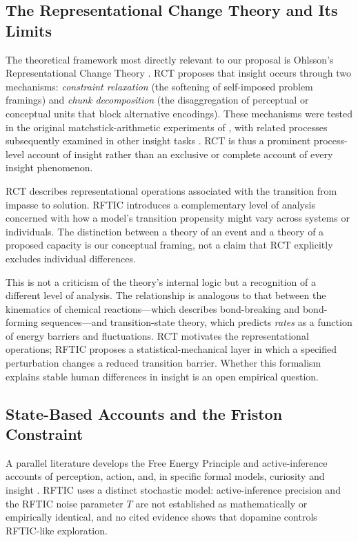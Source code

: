 \documentclass[a4paper,twocolumn,10pt]{article}
\begin{document}
\subsection{The Representational Change Theory and Its Limits}

The theoretical framework most directly relevant to our proposal is Ohlsson's Representational
Change Theory \citep[RCT;][]{ohlsson1992insight, ohlsson2011deep}. RCT proposes that insight occurs through
two mechanisms: \emph{constraint relaxation} (the softening of self-imposed problem framings) and
\emph{chunk decomposition} (the disaggregation of perceptual or conceptual units that block
alternative encodings). These mechanisms were tested in the original matchstick-arithmetic
experiments of \citet{knoblich1999constraint}, with related processes subsequently examined in other
insight tasks \citep{knoblich2001eyemovement,ollinger2008mentalset,ollinger2014ninedot,
danek2020closing}. RCT is thus a prominent process-level account of insight rather than an exclusive
or complete account of every insight phenomenon.

RCT describes representational operations associated with the transition from impasse to solution.
RFTIC introduces a complementary level of analysis concerned with how a model's transition propensity
might vary across systems or individuals. The distinction between a theory of an event and a theory
of a proposed capacity is our conceptual framing, not a claim that RCT explicitly excludes
individual differences.

This is not a criticism of the theory's internal logic but a recognition of a different level of
analysis. The relationship is analogous to that between the kinematics of chemical reactions---which
describes bond-breaking and bond-forming sequences---and transition-state theory, which predicts
\emph{rates} as a function of energy barriers and fluctuations. RCT motivates the representational
operations; RFTIC proposes a statistical-mechanical layer in which a specified perturbation changes
a reduced transition barrier. Whether this formalism explains stable human differences in insight
is an open empirical question.

\subsection{State-Based Accounts and the Friston Constraint}

A parallel literature develops the Free Energy Principle and active-inference accounts of
perception, action, and, in specific formal models, curiosity and insight
\citep{friston2010freeenergy,friston2017activeinference}. RFTIC uses a distinct stochastic model:
active-inference precision and the RFTIC noise parameter $T$ are not established as mathematically or
empirically identical, and no cited evidence shows that dopamine controls RFTIC-like exploration.
\end{document}
